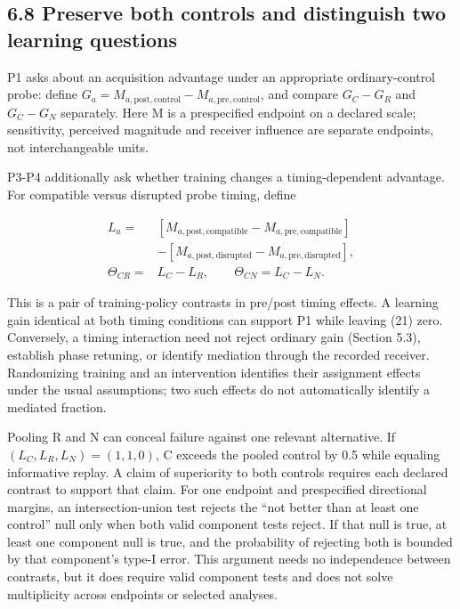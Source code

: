 \documentclass[
  american,
  11pt,
  letterpaper,
]{article}
\begin{document}
\subsection{6.8 Preserve both controls and distinguish two learning questions}\label{preserve-both-controls-and-distinguish-two-learning-questions}

P1 asks about an acquisition advantage under an appropriate ordinary-control probe: define \(G_a=M_{a,\mathrm{post},\mathrm{control}}-M_{a,\mathrm{pre},\mathrm{control}}\), and compare \(G_C-G_R\) and \(G_C-G_N\) separately. Here M is a prespecified endpoint on a declared scale; sensitivity, perceived magnitude and receiver influence are separate endpoints, not interchangeable units.

P3-P4 additionally ask whether training changes a timing-dependent advantage. For compatible versus disrupted probe timing, define

\begin{equation}
\begin{aligned}L_a={}&[M_{a,\mathrm{post},\mathrm{compatible}}-M_{a,\mathrm{pre},\mathrm{compatible}}]\\ &-[M_{a,\mathrm{post},\mathrm{disrupted}}-M_{a,\mathrm{pre},\mathrm{disrupted}}],\\ \Theta_{CR}={}&L_C-L_R,\qquad\Theta_{CN}=L_C-L_N.\end{aligned}\tag{21}
\end{equation}

This is a pair of training-policy contrasts in pre/post timing effects. A learning gain identical at both timing conditions can support P1 while leaving (21) zero. Conversely, a timing interaction need not reject ordinary gain (Section 5.3), establish phase retuning, or identify mediation through the recorded receiver. Randomizing training and an intervention identifies their assignment effects under the usual assumptions; two such effects do not automatically identify a mediated fraction.

Pooling R and N can conceal failure against one relevant alternative. If \((L_C,L_R,L_N)=(1,1,0)\), C exceeds the pooled control by 0.5 while equaling informative replay. A claim of superiority to both controls requires each declared contrast to support that claim. For one endpoint and prespecified directional margins, an intersection-union test rejects the ``not better than at least one control'' null only when both valid component tests reject. If that null is true, at least one component null is true, and the probability of rejecting both is bounded by that component's type-I error. This argument needs no independence between contrasts, but it does require valid component tests and does not solve multiplicity across endpoints or selected analyses.
\end{document}
